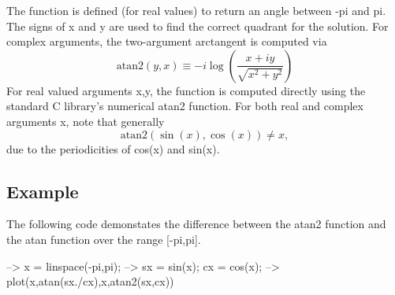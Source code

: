 The function is defined (for real values) to return an angle between {\ttfamily -\/pi} and {\ttfamily pi}. The signs of {\ttfamily x} and {\ttfamily y} are used to find the correct quadrant for the solution. For complex arguments, the two-\/argument arctangent is computed via \[ \mathrm{atan2}(y,x) \equiv -i \log\left(\frac{x+i y}{\sqrt{x^2+y^2}} \right) \] For real valued arguments {\ttfamily x,y}, the function is computed directly using the standard C library's numerical {\ttfamily atan2} function. For both real and complex arguments {\ttfamily x}, note that generally \[ \mathrm{atan2}(\sin(x),\cos(x)) \neq x, \] due to the periodicities of {\ttfamily cos(x)} and {\ttfamily sin(x)}. \hypertarget{variables_struct_Example}{}\subsection{Example}\label{variables_struct_Example}
The following code demonstates the difference between the {\ttfamily atan2} function and the {\ttfamily atan} function over the range {\ttfamily \mbox{[}-\/pi,pi\mbox{]}}.


\begin{DoxyVerbInclude}
--> x = linspace(-pi,pi);
--> sx = sin(x); cx = cos(x);
--> plot(x,atan(sx./cx),x,atan2(sx,cx))
\end{DoxyVerbInclude}


